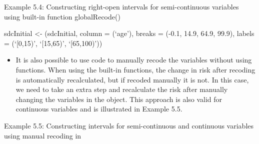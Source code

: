 \documentclass[letterpaper,10pt,english]{sphinxmanual}
\begin{document}
Example 5.4: Constructing right-open intervals for semi-continuous
variables using built-in  function globalRecode()

sdcInitial \textless{}- (sdcInitial, column = (‘age’),
breaks = (-0.1, 14.9, 64.9, 99.9), labels = (‘{[}0,15)’,
‘{[}15,65)’, ‘{[}65,100)’))
\begin{itemize}
\item {} 
It is also possible to use  code to manually recode the variables
without using  functions. When using the built-in
 functions, the change in risk after recoding is
automatically recalculated, but if recoded manually it is not. In
this case, we need to take an extra step and recalculate the risk
after manually changing the variables in the  object. This
approach is also valid for continuous variables and is illustrated in
Example 5.5.

\end{itemize}

Example 5.5: Constructing intervals for semi-continuous and continuous
variables using manual recoding in 
\end{document}

